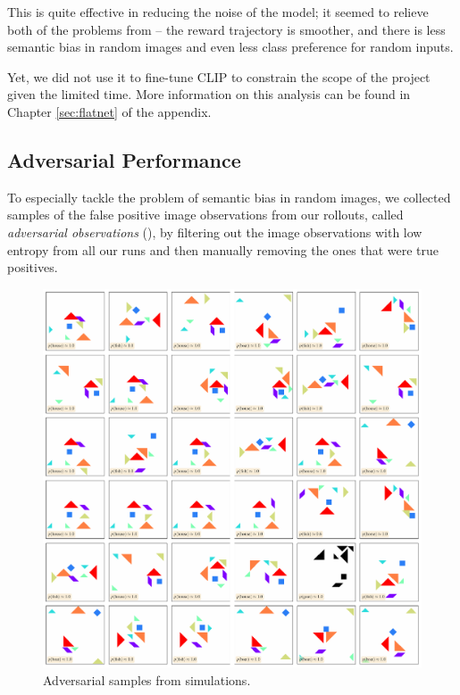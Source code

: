 This is quite effective in reducing the noise of the model; it seemed to relieve both of the problems from  -- the reward trajectory is smoother, and there is less semantic bias in random images and even less class preference for random inputs.

Yet, we did not use it to fine-tune CLIP to constrain the scope of the project given the limited time.
More information on this analysis can be found in Chapter \ref{sec:flatnet} of the appendix.

\subsection{Adversarial Performance}
\label{sec:adversarial-performance}
To especially tackle the problem of semantic bias in random images, we collected samples of the false positive image observations from our rollouts, called \emph{adversarial observations} (), by filtering out the image observations with low entropy from all our runs and then manually removing the ones that were true positives.

\begin{figure}[h]
    \centering
    \includegraphics[width=\textwidth]{images/adversarial_samples.pdf}
    \caption{Adversarial samples from simulations.}
    \label{fig:semantic-bias-random}
\end{figure}

